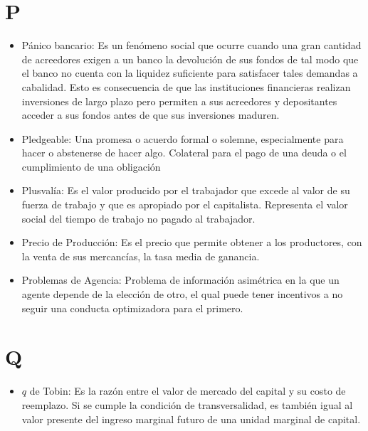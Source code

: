 \documentclass{article}
\begin{document}
\section{P}
\begin{itemize}

\item Pánico bancario: Es un fenómeno social que ocurre cuando una gran cantidad de acreedores exigen  a un banco la devolución de sus fondos de tal modo que el banco no cuenta con la liquidez suficiente para satisfacer tales demandas a cabalidad. Esto es consecuencia de que las instituciones financieras realizan inversiones de largo plazo pero permiten a sus acreedores y depositantes acceder a sus fondos antes de que sus inversiones maduren. 

\item Pledgeable: Una promesa o acuerdo formal o solemne, especialmente para hacer o abstenerse de hacer algo. Colateral para el pago de una deuda o el cumplimiento de una obligación

\item Plusvalía: Es el valor producido por el trabajador que excede al valor de su fuerza de trabajo y que es apropiado por el capitalista. Representa el valor social del tiempo de trabajo no pagado al trabajador.

\item Precio de Producción: Es el precio que permite obtener a los productores, con la venta de sus mercancías, la tasa media de ganancia. 

\item Problemas de Agencia: Problema de información asimétrica  en la que  un agente  depende de la elección de otro, el qual puede tener incentivos a no seguir una conducta optimizadora para el primero.

\end{itemize}

\section{Q}
\begin{itemize}

\item $q$ de Tobin: Es la razón entre el valor de mercado del capital y su costo de reemplazo. Si se cumple la condición de transversalidad, es también igual al valor presente del ingreso marginal futuro de una unidad marginal de capital. 

\end{itemize}
\end{document}
